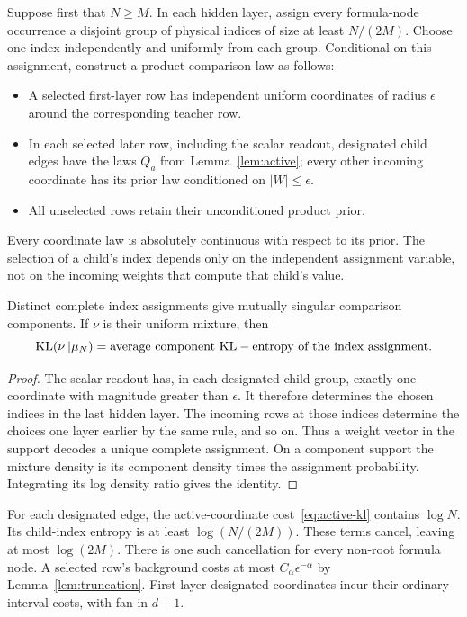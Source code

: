Suppose first that $N\ge M$. In each hidden layer, assign every formula-node occurrence a disjoint group of physical indices of size at least $N/(2M)$. Choose one index independently and uniformly from each group. Conditional on this assignment, construct a product comparison law as follows:
\begin{itemize}
\item A selected first-layer row has independent uniform coordinates of radius $\epsilon$ around the corresponding teacher row.
\item In each selected later row, including the scalar readout, designated child edges have the laws $Q_a$ from Lemma~\ref{lem:active}; every other incoming coordinate has its prior law conditioned on $|W|\le\epsilon$.
\item All unselected rows retain their unconditioned product prior.
\end{itemize}
Every coordinate law is absolutely continuous with respect to its prior. The selection of a child's index depends only on the independent assignment variable, not on the incoming weights that compute that child's value.

\begin{lemma}\label{lem:disjoint}
Distinct complete index assignments give mutually singular comparison components. If $\nu$ is their uniform mixture, then
\[
 \operatorname{KL}(\nu\|\mu_N)=\text{average component KL}
                 -\text{entropy of the index assignment}.
\]
\end{lemma}
\begin{proof}
The scalar readout has, in each designated child group, exactly one coordinate with magnitude greater than $\epsilon$. It therefore determines the chosen indices in the last hidden layer. The incoming rows at those indices determine the choices one layer earlier by the same rule, and so on. Thus a weight vector in the support decodes a unique complete assignment. On a component support the mixture density is its component density times the assignment probability. Integrating its log density ratio gives the identity.
\end{proof}

For each designated edge, the active-coordinate cost~\eqref{eq:active-kl} contains $\log N$. Its child-index entropy is at least $\log(N/(2M))$. These terms cancel, leaving at most $\log(2M)$. There is one such cancellation for every non-root formula node. A selected row's background costs at most $C_\alpha\epsilon^{-\alpha}$ by Lemma~\ref{lem:truncation}. First-layer designated coordinates incur their ordinary interval costs, with fan-in $d+1$.

